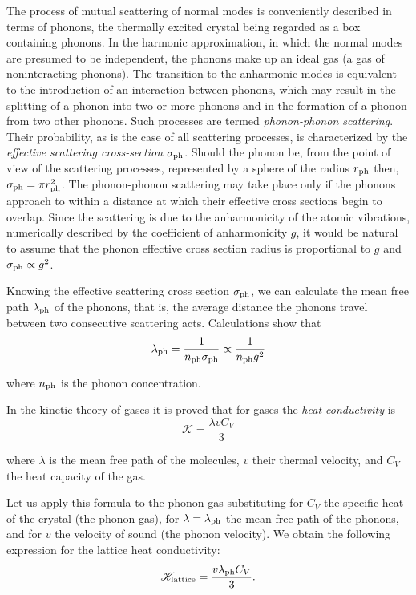 The process of mutual scattering of normal modes is conveniently described in terms of phonons, the thermally excited crystal being regarded as a box containing phonons. In the harmonic approximation, in which the normal modes are presumed to be independent, the phonons make up an ideal gas (a gas of noninteracting phonons). The transition to the anharmonic modes is equivalent to the introduction of an interaction between phonons, which may result in the splitting of a phonon into two or more phonons and in the formation of a phonon from two other phonons. Such processes are termed \textit{phonon-phonon scattering}. Their probability, as is the case of all scattering processes, is characterized by the \textit{effective scattering cross-section} $\sigma_{\text{ph}}$. Should the phonon be, from the point of view of the scattering processes, represented by a sphere of the radius $r_{\text{ph}}$ then, $\sigma_{\text{ph}}=\pi r_{\text{ph}}^2$. The phonon-phonon scattering may take place only if the phonons approach to within a distance at which their effective cross sections begin to overlap. Since the scattering is due to the anharmonicity of the atomic vibrations, numerically described by the coefficient of anharmonicity $g$, it would be natural to assume that the phonon effective cross section radius is proportional to $g$ and $\sigma_{\text{ph}}\propto g^2$.

Knowing the effective scattering cross section $\sigma_{\text{ph}}$, we can calculate the mean free path $\lambda_{\text{ph}}$ of the phonons, that is, the average distance the phonons travel between two consecutive scattering acts. Calculations show that
\begin{equation}\label{eq:4_51}
    \lambda_{\text{ph}} = \frac{1}{n_{\text{ph}} \sigma_{\text{ph}}} \propto \frac{1}{n_{\text{ph}} g^2}
\end{equation}

\noindent
where $n_{\text{ph}}$ is the phonon concentration.

In the kinetic theory of gases it is proved that for gases the \textit{heat conductivity} is
\begin{equation}\label{eq:4_52}
    \mathscr{K} = \frac{\lambda v C_V}{3}
\end{equation}

\noindent
where $\lambda$ is the mean free path of the molecules, $v$ their thermal velocity, and $C_V$ the heat capacity of the gas.

Let us apply this formula to the phonon gas substituting for $C_V$ the specific heat of the crystal (the phonon gas), for $\lambda=\lambda_{\text{ph}}$ the mean free path of the phonons, and for $v$ the velocity of sound (the phonon velocity). We obtain the following expression for the lattice heat conductivity:
\begin{equation}\label{eq:4_53}
    \mathscr{K}_{\text{lattice}} = \frac{v \lambda_{\text{ph}} C_V}{3}.
\end{equation}

